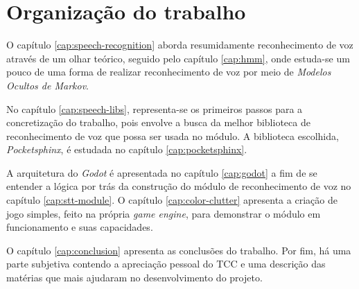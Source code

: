 
\section{Organização do trabalho}

O capítulo \ref{cap:speech-recognition} aborda resumidamente reconhecimento de voz através de um olhar teórico, seguido pelo capítulo \ref{cap:hmm}, onde estuda-se um pouco de uma forma de realizar reconhecimento de voz por meio de \textit{Modelos Ocultos de Markov}.

No capítulo \ref{cap:speech-libs}, representa-se os primeiros passos para a concretização do trabalho, pois envolve a busca da melhor biblioteca de reconhecimento de voz que possa ser usada no módulo. A biblioteca escolhida, \textit{Pocketsphinx}, é estudada no capítulo \ref{cap:pocketsphinx}.

A arquitetura do \textit{Godot} é apresentada no capítulo \ref{cap:godot} a fim de se entender a lógica por trás da construção do módulo de reconhecimento de voz no capítulo \ref{cap:stt-module}. O capítulo \ref{cap:color-clutter} apresenta a criação de jogo simples, feito na própria \textit{game engine}, para demonstrar o módulo em funcionamento e suas capacidades.

O capítulo \ref{cap:conclusion} apresenta as conclusões do trabalho. Por fim, há uma parte subjetiva contendo a apreciação pessoal do TCC e uma descrição das matérias que mais ajudaram no desenvolvimento do projeto.
